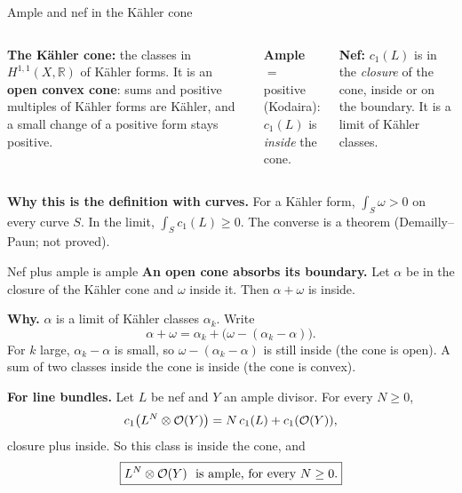\begin{frame}{Ample and nef in the Kähler cone}
\label{fr:kv-cone}
\begin{columns}[T]
\textbf{The Kähler cone:} the classes in \(H^{1,1}(X,\mathbb R)\) of Kähler forms. It is an \textbf{open convex cone}: sums and positive multiples of Kähler forms are Kähler, and a small change of a positive form stays positive.
\par\smallskip
\textbf{Ample} \(=\) positive (Kodaira):\\ \(c_1(L)\) is \emph{inside} the cone.
\par\smallskip
\textbf{Nef:} \(c_1(L)\) is in the \emph{closure} of the cone, inside or on the boundary. It is a limit of Kähler classes.
\centering
{}
\end{columns}
\par\smallskip
\textbf{Why this is the definition with curves.} For a Kähler form, \(\int_S\omega>0\) on every curve \(S\). In the limit, \(\int_Sc_1(L)\ge0\). The converse is a theorem (Demailly--Paun; not proved).
\end{frame}

\begin{frame}{Nef plus ample is ample}
\label{fr:kv-nef-ample}
\textbf{An open cone absorbs its boundary.} Let \(\alpha\) be in the closure of the Kähler cone and \(\omega\) inside it. Then \(\alpha+\omega\) is inside.
\par\medskip
\textbf{Why.} \(\alpha\) is a limit of Kähler classes \(\alpha_k\). Write
\[
\alpha+\omega=\alpha_k+\bigl(\omega-(\alpha_k-\alpha)\bigr).
\]
For \(k\) large, \(\alpha_k-\alpha\) is small, so \(\omega-(\alpha_k-\alpha)\) is still inside (the cone is open). A sum of two classes inside the cone is inside (the cone is convex).
\par\bigskip
\textbf{For line bundles.} Let \(L\) be nef and \(Y\) an ample divisor. For every \(N\ge0\),
\[
c_1\bigl(L^N\otimes\mathcal O(Y)\bigr)=N\,c_1(L)+c_1(\mathcal O(Y)),
\]
closure plus inside. So this class is inside the cone, and
\[
\boxed{L^N\otimes\mathcal O(Y)\ \text{ is ample, for every } N\ge0 .}
\]
\end{frame}


